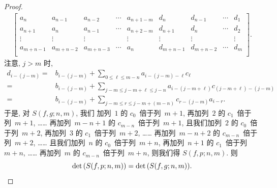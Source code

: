 \documentclass[../libro.tex]{subfiles}
\begin{document}
\begin{proof}
\begin{align*}
\begin{bmatrix}
            a_{n}     & a_{n-1}   & a_{n-2}   & \cdots & a_{n+1-m} & d_{n}     & d_{n-1}   & \cdots & d_{1}   \\
            a_{n+1}   & a_{n}     & a_{n-1}   & \cdots & a_{n+2-m} & d_{n+1}   & d_{n}     & \cdots & d_{2}   \\
            \vdots    & \vdots    & \vdots    & {}     & \vdots    & \vdots    & \vdots    & {}     & \vdots  \\
            a_{m+n-1} & a_{m+n-2} & a_{m+n-3} & \cdots & a_{n}     & d_{m+n-1} & d_{m+n-2} & \cdots & d_{m}   \\
        \end{bmatrix}.
    \end{align*}
    注意, \(j > m\) 时,
    \begin{align*}
        d_{i-(j-m)}
        = {} &
        b_{i-(j-m)} + \sum_{0 \leq \ell \leq m-n} {a_{i-(j-m)-\ell} c_{\ell}}
        \\
        = {} &
        b_{i-(j-m)} + \sum_{j-m \leq j-m+\ell \leq j-n} {a_{i-(j-m+\ell)} c_{(j-m+\ell)-(j-m)}}
        \\
        = {} &
        b_{i-(j-m)} + \sum_{j-m \leq r \leq j-m+(m-n)} {c_{r-(j-m)} a_{i-r}}.
    \end{align*}
    于是, 对 \(S(f, g; n, m)\), 我们%
    加列~\(1\) 的 \(c_0\)~倍于列~\(m+1\),
    再加列~\(2\) 的 \(c_1\)~倍于列~\(m+1\),
    ……
    再加列~\(m-n+1\) 的 \(c_{m-n}\)~倍于列~\(m+1\),
    且我们加列~\(2\) 的 \(c_0\)~倍于列~\(m+2\),
    再加列~\(3\) 的 \(c_1\)~倍于列~\(m+2\),
    ……
    再加列~\(m-n+2\) 的 \(c_{m-n}\)~倍于列~\(m+2\),
    ……
    且我们加列~\(n\) 的 \(c_0\)~倍于列~\(m+n\),
    再加列~\(n+1\) 的 \(c_1\)~倍于列~\(m+n\),
    ……
    再加列~\(m\) 的 \(c_{m-n}\)~倍于列~\(m+n\),
    则我们得 \(S(f, p; n, m)\).
    则
    \begin{equation*}
        \det {(S(f, p; n, m))} = \det {(S(f, g; n, m))}.
        \qedhere
    \end{equation*}
\end{proof}
\end{document}
